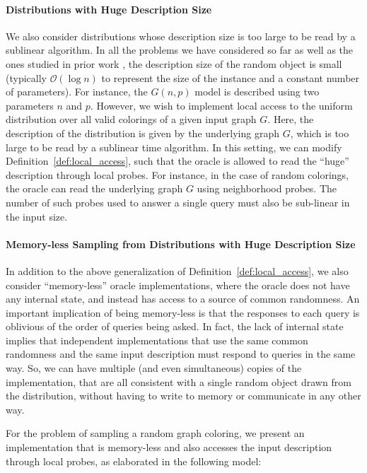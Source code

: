 \paragraph*{Distributions with Huge Description Size}
\label{par:distributions_with_huge_description_size}
We also consider distributions whose description size is too large to be read by a sublinear algorithm.
In all the problems we have considered so far as well as the ones studied in prior work \cite{huge,sparse,reut}, the description size
of the random object is small (typically $\mathcal O(\log n)$ to represent the size of the instance and a constant number of parameters).
For instance, the $G(n, p)$ model is described using two parameters $n$ and $p$.
However, we wish to implement local access to the uniform distribution over all valid colorings of a given input graph $G$.
Here, the description of the distribution is given by the underlying graph $G$, which is too large to be read by a sublinear time algorithm.
In this setting, we can modify Definition~\ref{def:local_access}, such that the oracle is allowed to read the ``huge'' description through local probes.
For instance, in the case of random colorings, the oracle can read the underlying graph $G$ using neighborhood probes.
The number of such probes used to answer a single query must also be sub-linear in the input size.


\paragraph*{Memory-less Sampling from Distributions with Huge Description Size}
\label{par:memory_less_sampling_from_distributions_with_huge_description_size}
In addition to the above generalization of Definition~\ref{def:local_access}, we also consider ``memory-less'' oracle implementations,
where the oracle does not have any internal state, and instead has access to a source of common randomness.
An important implication of being memory-less is that the responses to each query is oblivious of the order of queries being asked.
In fact, the lack of internal state implies that independent implementations that use the same common randomness and the same input description
must respond to queries in the same way.
So, we can have multiple (and even simultaneous) copies of the implementation,
that are all consistent with a single random object drawn from the distribution, without having to write to memory or communicate in any other way.

For the problem of sampling a random graph coloring,
we present an implementation that is memory-less and also accesses the input description through local probes,
as elaborated in the following model:

